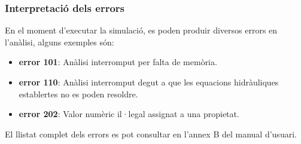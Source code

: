 \documentclass[12pt]{article}
\begin{document}
\subsubsection{Interpretació dels errors}
En el moment d'executar la simulació, es poden produir diversos errors en l'anàlisi, alguns exemples són:
\begin{itemize}
	\item \textbf{error 101}: Anàlisi interromput per falta de memòria.
	\item \textbf{error 110}: Anàlisi interromput degut a que les equacions hidràuliques establertes no es poden resoldre.
	\item \textbf{error 202}: Valor numèric il·legal assignat a una propietat.
\end{itemize}
El llistat complet dels errors es pot consultar en l'annex B del manual d'usuari\cite{DocuEpanet}.

\clearpage
\end{document}
